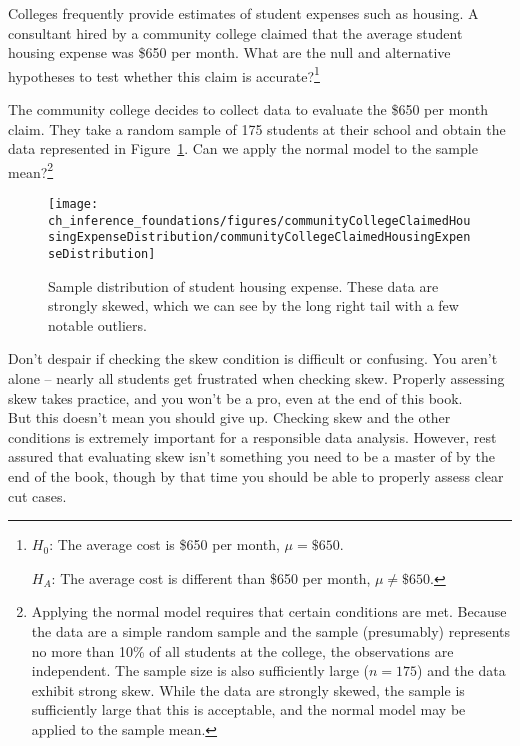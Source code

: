\begin{exercise} \label{htForHousingExpenseForCommunityCollege650}
Colleges frequently provide estimates of student expenses such as housing. A consultant hired by a community college claimed that the average student housing expense was \$650 per month. What are the null and alternative hypotheses to test whether this claim is accurate?\footnote{$H_0$: The average cost is \$650 per month, $\mu = \$650$.

\hspace{3.4mm}$H_A$: The average cost is different than \$650 per month, $\mu \neq \$650$.}
\end{exercise}

\begin{exercise} \label{normalDistCondForHousingExpenseForCommunityCollege650}
The community college decides to collect data to evaluate the \$650 per month claim. They take a random sample of 175 students at their school and obtain the data represented in Figure~\ref{communityCollegeClaimedHousingExpenseDistribution}. Can we apply the normal model to the sample mean?\footnote{Applying the normal model requires that certain conditions are met. Because the data are a simple random sample and the sample (presumably) represents no more than 10\% of all students at the college, the observations are independent. The sample size is also sufficiently large ($n = 175$) and the data exhibit strong skew. While the data are strongly skewed, the sample is sufficiently large that this is acceptable, and the normal model may be applied to the sample mean.}

\begin{figure}
\centering
\texttt{[image: ch\_inference\_foundations/figures/communityCollegeClaimedHousingExpenseDistribution/communityCollegeClaimedHousingExpenseDistribution]}
\caption{Sample distribution of student housing expense. These data are strongly skewed, which we can see by the long right tail with a few notable outliers.}
\label{communityCollegeClaimedHousingExpenseDistribution}
\end{figure}
\end{exercise}

\begin{tipBox}{
Don't despair if checking the skew condition is difficult or confusing. You aren't alone -- nearly all students get frustrated when checking skew. Properly assessing skew takes practice, and you won't be a pro, even at the end of this book. \\[2mm]
But this doesn't mean you should give up. Checking skew and the other conditions is extremely important for a responsible data analysis. However, rest assured that evaluating skew isn't something you need to be a master of by the end of the book, though by that time you should be able to properly assess clear cut cases.}
\end{tipBox}

